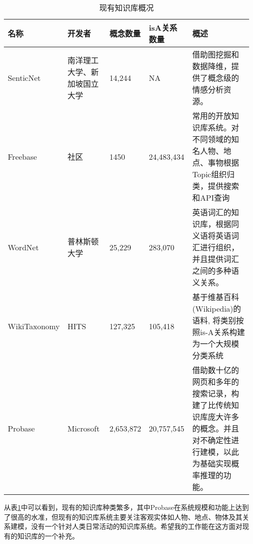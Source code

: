 \begin{table}[!h]
\begin{tabular}[0.7\textwidth]{|l|p{2cm}|l|l|p{4cm}|}

\hline
名称 		& 开发者 & 概念数量 & isA关系数量 & 概述 \\
\hline
SenticNet	& 南洋理工大学、新加坡国立大学 & 14,244 & NA & 借助图挖掘和数据降维，提供了概念级的情感分析资源。 \\
\hline
Freebase	& 社区	& 1450	& 24,483,434 & 常用的开放知识库系统。对不同领域的知名人物、地点、事物根据Topic组织归类，提供搜索和API查询 \\
\hline
WordNet\cite{miller1995wordnet} & 普林斯顿大学 & 25,229 & 283,070 & 英语词汇的知识库，根据同义语将英语词汇进行组织，并且提供词汇之间的多种语义关系。 \\
\hline
WikiTaxonomy\cite{ponzetto2007deriving}	& HITS & 127,325 & 105,418 & 基于维基百科(Wikipedia)的语料, 将类别按照is-A关系构建为一个大规模分类系统 \\
\hline
Probase & Microsoft & 2,653,872 & 20,757,545 & 借助数十亿的网页和多年的搜索记录，构建了比传统知识库庞大许多的概念。并且对不确定性进行建模，以此为基础实现概率推理的功能。 \\
\hline
\end{tabular}
\caption{现有知识库概况}
\label{table:knowledge_base}
\end{table}

从表\ref{table:knowledge_base}中可以看到，现有的知识库种类繁多，其中Probase在系统规模和功能上达到了很高的水准，但现有的知识库系统主要关注客观实体如人物、地点、物体及其关系建模，没有一个针对人类日常活动的知识库系统。希望我的工作能在这方面对现有的知识库的一个补充。


